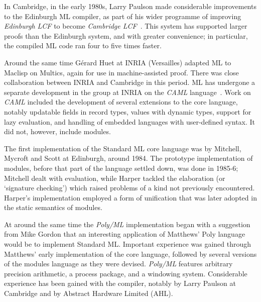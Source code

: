 In Cambridge, in the early 1980s, Larry Paulson made considerable improvements
to the Edinburgh ML compiler, as part of his wider programme of improving {\em
Edinburgh LCF} to become {\em Cambridge LCF}~\cite{Pau}.  This system has
supported larger proofs than the Edinburgh system, and with greater
convenience; in particular, the compiled ML code ran four to five times
faster.

Around the same time G\'{e}rard Huet at INRIA (Versailles) adapted ML to
Maclisp on Multics, again for use in machine-assisted proof.  There was close
collaboration between INRIA and Cambridge in this period.  ML has undergone a
separate development in the group at INRIA on the {\em CAML}
language~\cite{CCM}.  Work on {\em CAML} included the development of several
extensions to the core language, notably updatable fields in record types,
values with dynamic types, support for lazy evaluation, and handling of
embedded languages with user-defined syntax.  It did not, however, include
modules.

The first implementation of the Standard ML core language was by Mitchell,
Mycroft and Scott at Edinburgh, around 1984.  The prototype implementation of
modules, before that part of the language settled down, was done in 1985-6;
Mitchell dealt with evaluation, while Harper tackled the elaboration (or
`signature checking') which raised problems of a kind not previously
encountered.  Harper's implementation employed a form of unification that was
later adopted in the static semantics of modules.

At around the same time the {\em Poly/ML} implementation began with a
suggestion from Mike Gordon that an interesting application of Matthews' Poly
language would be to implement Standard ML.  Important experience was gained
through Matthews' early implementation of the core language, followed by
several versions of the modules language as they were devised.  {\em Poly/ML}
features arbitrary precision arithmetic, a process package, and a windowing
system.  Considerable experience has been gained with the compiler, notably by
Larry Paulson at Cambridge and by Abstract Hardware Limited (AHL).

